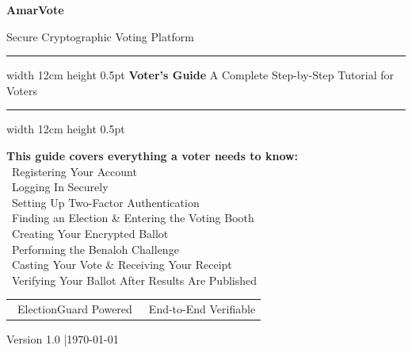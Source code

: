 \documentclass[12pt,a4paper,openany]{book}
\let\faSignInAlt\relax\newcommand{\faSignInAlt}{\faArrowRight}
\let\faShieldAlt\relax\newcommand{\faShieldAlt}{\faExclamationTriangle}
\let\faCheckDouble\relax\newcommand{\faCheckDouble}{\faCheck}
\let\faVoteYea\relax\newcommand{\faVoteYea}{\faThumbsUp}
\begin{document}
\begin{titlepage}
	\pagecolor{coverbg}
	\color{white}
	\centering
	\vspace*{2cm}

	{\fontsize{60}{65}\selectfont\bfseries AmarVote}

	\vspace{0.5cm}
	{\Large\color{accentteal} Secure Cryptographic Voting Platform}

	\vspace{1.5cm}
	\hrule width 12cm height 0.5pt
	\vspace{0.4cm}
	{\LARGE\bfseries Voter's Guide}
	\vspace{0.2cm}
	{\large\color{accentteal} A Complete Step-by-Step Tutorial for Voters}
	\vspace{0.4cm}
	\hrule width 12cm height 0.5pt

	\vspace{2cm}

	\begin{tcolorbox}[
			enhanced, width=10cm,
			colback=primaryblue!80!black, colframe=accentteal,
			arc=6pt, boxrule=1.5pt,
			left=12pt, right=12pt, top=10pt, bottom=10pt
		]
		\centering\color{white}
		\textbf{This guide covers everything a voter needs to know:}\\[6pt]
		\textcolor{accentteal}{\faUserPlus} \, Registering Your Account\\[4pt]
		\textcolor{accentteal}{\faSignInAlt} \, Logging In Securely\\[4pt]
		\textcolor{accentteal}{\faShieldAlt} \, Setting Up Two-Factor Authentication\\[4pt]
		\textcolor{accentteal}{\faVoteYea} \, Finding an Election \& Entering the Voting Booth\\[4pt]
		\textcolor{accentteal}{\faLock} \, Creating Your Encrypted Ballot\\[4pt]
		\textcolor{accentteal}{\faQuestion} \, Performing the Benaloh Challenge\\[4pt]
		\textcolor{accentteal}{\faPaperPlane} \, Casting Your Vote \& Receiving Your Receipt\\[4pt]
		\textcolor{accentteal}{\faCheckDouble} \, Verifying Your Ballot After Results Are Published
	\end{tcolorbox}

	\vfill

	\begin{tabular}{cc}
		\textcolor{accentteal}{\faLock} \, ElectionGuard Powered &
		\textcolor{accentteal}{\faEye} \, End-to-End Verifiable
	\end{tabular}

	\vspace{1cm}
	{\small Version 1.0 \quad|\quad \today}
\end{titlepage}
\nopagecolor
\color{black}
\end{document}

